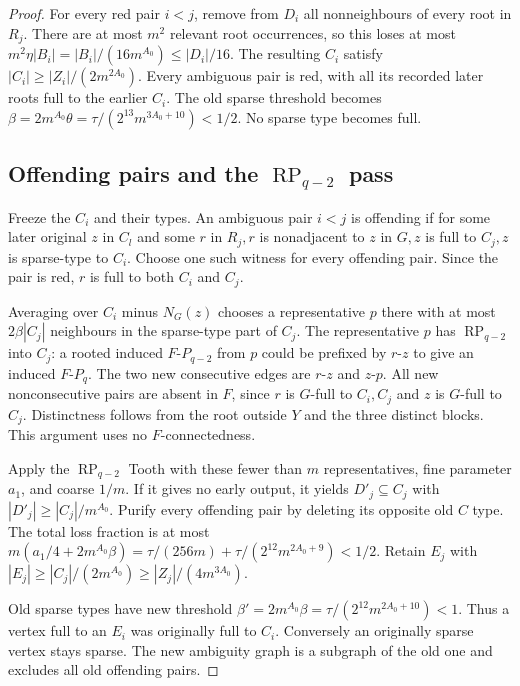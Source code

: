 \documentclass[11pt,a4paper]{article}
\theoremstyle{definition}
\theoremstyle{remark}
\numberwithin{equation}{section}
\DeclareMathOperator{\RP}{RP}
\begin{document}
\begin{proof}
For every red pair \(i<j\), remove from \(D_{i}\) all nonneighbours of every root in \(R_{j}\). There are at most \(m^{2}\) relevant root occurrences, so this loses at most \(m^{2} \eta |B_{i}|=|B_{i}|/(16m^{A_{0}})\le\allowbreak |D_{i}|/16\). The resulting \(C_{i}\) satisfy \(|C_{i}|\ge\allowbreak |Z_{i}|/(2m^{2A_{0}})\). Every ambiguous pair is red, with all its recorded later roots full to the earlier \(C_{i}\). The old sparse threshold becomes \(\beta=2m^{A_{0}} \theta=\tau/(2^{13} m^{3A_{0}+10})<1/2\). No sparse type becomes full.
\subsection{Offending pairs and the \texorpdfstring{\(\RP_{q-2}\)}{RP(q-2)} pass}\label{subsec:rpq-offending}
Freeze the \(C_{i}\) and their types. An ambiguous pair \(i<j\) is offending if for some later original \(z\) in \(C_{l}\) and some \(r\) in \(R_{j},\allowbreak  r\) is nonadjacent to \(z\) in \(G,\allowbreak  z\) is full to \(C_{j},\allowbreak  z\) is sparse-type to \(C_{i}\). Choose one such witness for every offending pair. Since the pair is red, \(r\) is full to both \(C_{i}\) and \(C_{j}\).

Averaging over \(C_{i}\) minus \(N_{G}(z)\) chooses a representative \(p\) there with at most \(2\beta |C_{j}|\) neighbours in the sparse-type part of \(C_{j}\). The representative \(p\) has \(\RP_{q-2}\) into \(C_{j}\): a rooted induced \(F\text{-}P_{q-2}\) from \(p\) could be prefixed by \(r\text{-}z\) to give an induced \(F\text{-}P_{q}\). The two new consecutive edges are \(r\text{-}z\) and \(z\text{-}p\). All new nonconsecutive pairs are absent in \(F\), since \(r\) is \(G\)-full to \(C_{i},\allowbreak C_{j}\) and \(z\) is \(G\)-full to \(C_{j}\). Distinctness follows from the root outside \(Y\) and the three distinct blocks. This argument uses no \(F\)-connectedness.

Apply the \(\RP_{q-2}\) Tooth with these fewer than \(m\) representatives, fine parameter \(a_{1}\), and coarse \(1/m\). If it gives no early output, it yields \(D'_{j}\subseteq C_{j}\) with \(|D'_{j}|\ge |C_{j}|/m^{A_{0}}\). Purify every offending pair by deleting its opposite old \(C\) type. The total loss fraction is at most \(m(a_{1}/4+2m^{A_{0}} \beta) =\tau/(256m)+\tau/(2^{12} m^{2A_{0}+9})<1/2\). Retain \(E_{j}\) with \(|E_{j}|\ge |C_{j}|/(2m^{A_{0}})\ge |Z_{j}|/(4m^{3A_{0}})\).

Old sparse types have new threshold \(\beta'=2m^{A_{0}} \beta=\tau/(2^{12} m^{2A_{0}+10})<1\). Thus a vertex full to an \(E_{i}\) was originally full to \(C_{i}\). Conversely an originally sparse vertex stays sparse. The new ambiguity graph is a subgraph of the old one and excludes all old offending pairs.


\end{proof}
\end{document}
